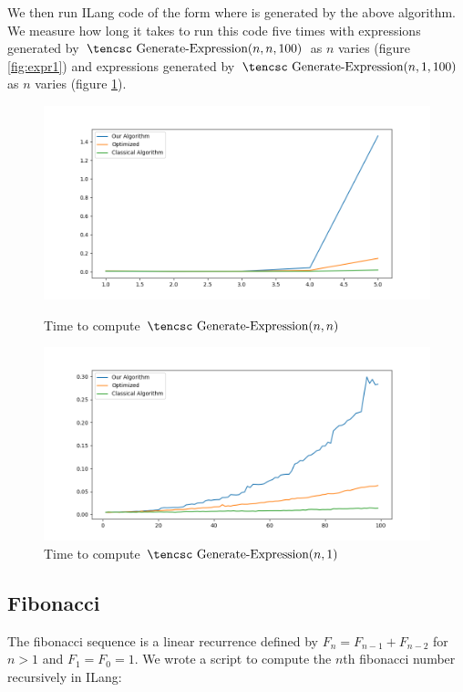 \documentclass{llncs}
\newcounter{algo}
\begin{document}
\noindent We then run ILang code of the form  where  is generated by the above algorithm.
We measure how long it takes to run this code five times with expressions generated by $\hbox{\tencsc Generate-Expression}(n,n,100)$ as $n$ varies (figure \ref{fig:expr1}) and
expressions generated by $\hbox{\tencsc Generate-Expression}(n,1,100)$ as $n$ varies (figure \ref{fig:expr2}).

\begin{figure}

    \centerline{\includegraphics[width=\hsize]{../Docs/Images/expr-n-n.png}}
    \caption{Time to compute $\hbox{\tencsc Generate-Expression}(n,n)$}
    \label{fig:expr1}
    \medskip
    \centerline{\includegraphics[width=\hsize]{../Docs/Images/expr-n-1.png}}
    \caption{Time to compute $\hbox{\tencsc Generate-Expression}(n,1)$}
    \label{fig:expr2}

\end{figure}

\subsection{Fibonacci}

The fibonacci sequence is a linear recurrence defined by $F_n=F_{n-1}+F_{n-2}$ for $n>1$ and $F_1=F_0=1$.
We wrote a script to compute the $n$th fibonacci number recursively in ILang:
\end{document}
